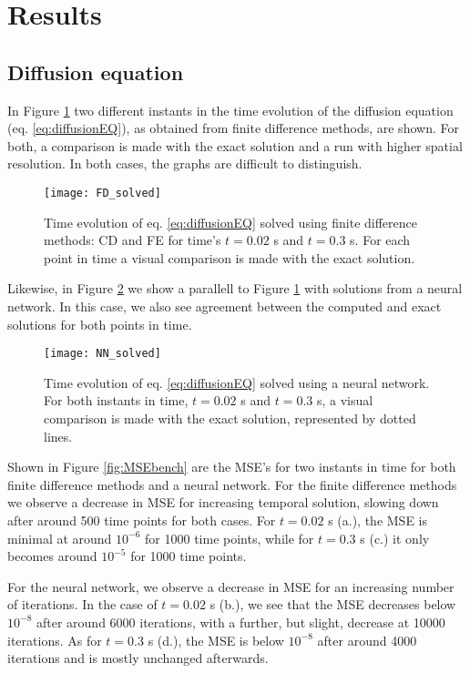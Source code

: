 \section{Results}
\label{sec:results}

\subsection{Diffusion equation}

In Figure \ref{fig:FDcompare} two different instants in the time evolution of the diffusion equation (eq. \ref{eq:diffusionEQ}), as obtained from finite difference methods, are shown. For both, a comparison is made with the exact solution and a run with higher spatial resolution. In both cases, the graphs are difficult to distinguish.
 \begin{figure}[htbp]
  	\centering
  	\texttt{[image: FD\_solved]}
  	\caption{Time evolution of eq. \ref{eq:diffusionEQ} solved using finite difference methods: CD and FE for time's $t=0.02$ s and $t=0.3$ s. For each point in time a visual comparison is made with the exact solution.}
   \label{fig:FDcompare}
 \end{figure}

Likewise, in Figure \ref{fig:NNcompare} we show a parallell to Figure \ref{fig:FDcompare} with solutions from a neural network. In this case, we also see agreement between the computed and exact solutions for both points in time.
 \begin{figure}[htbp]
  	\centering
  	\texttt{[image: NN\_solved]}
  	\caption{Time evolution of eq. \ref{eq:diffusionEQ} solved using a neural network. For both instants in time, $t=0.02$ s and $t=0.3$ s, a visual comparison is made with the exact solution, represented by dotted lines.}
   \label{fig:NNcompare}
 \end{figure}

Shown in Figure \ref{fig:MSEbench} are the MSE's for two instants in time for both finite difference methods and a neural network. For the finite difference methods we observe a decrease in MSE for increasing temporal solution, slowing down after around 500 time points for both cases. For $t=0.02$ s (a.), the MSE is minimal at around $10^{-6}$ for 1000 time points, while for $t=0.3$ s (c.) it only becomes around $10^{-5}$ for 1000 time points.

For the neural network, we observe a decrease in MSE for an increasing number of iterations. In the case of $t=0.02$ s (b.), we see that the MSE decreases below $10^{-8}$ after around 6000 iterations, with a further, but slight, decrease at 10000 iterations. As for $t=0.3$ s (d.), the MSE is below $10^{-8}$ after around 4000 iterations and is mostly unchanged afterwards.

